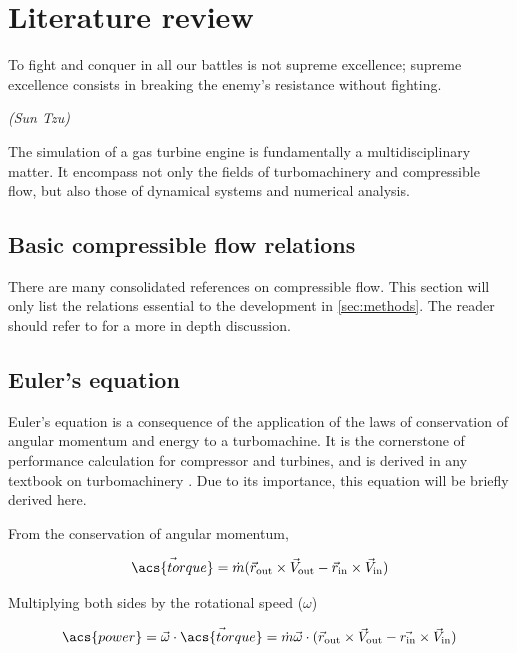 \documentclass[tcc]{subfiles}
\begin{document}
\textual



\chapter{Literature review}
\epigraph{To fight and conquer in all our battles is not supreme excellence; supreme excellence consists in breaking the enemy's resistance without fighting.}{\em(Sun Tzu)}

The simulation of a gas turbine engine is fundamentally a multidisciplinary matter.
It encompass not only the fields of turbomachinery and compressible flow, 
but also those of dynamical systems and numerical analysis. 

\section{Basic compressible flow relations}
There are many consolidated references on compressible flow. 
This section will only list the relations essential to the development in \cref{sec:methods}. 
The reader should refer to \textcite{Anderson, Shapiro} for a more in depth discussion.

\section{Euler's equation}
\label{sec:euler_equation}
Euler's equation is a consequence of the application of the laws of conservation of angular momentum and energy to a turbomachine. It is the cornerstone of performance calculation for compressor and turbines, and is derived in any textbook on turbomachinery \cite{Lakshminarayana1996, Dixon1998, Schobeiri2004, Hill1991, Logan2003, Baskharone2006}. Due to its importance, this equation will be briefly derived here.

From the conservation of angular momentum, 

\begin{equation}
    \vec{\acs{torque}} = \dot{m} (\vec{r}_{\text{out}}\cross\vec{V}_{\text{out}} - \vec{r}_{\text{in}}\cross\vec{V}_{\text{in}}) 
\end{equation}

Multiplying both sides by the rotational speed ($\omega$)

\begin{equation}
    \acs{power} = \vec{\omega}\cdot\vec{\acs{torque}} 
                = \dot{m} \vec{\omega} \cdot (\vec{r}_{\text{out}}\cross\vec{V}_{\text{out}} - \vec{r_{\text{in}}}\cross\vec{V}_{\text{in}}) 
\end{equation}
\end{document}
